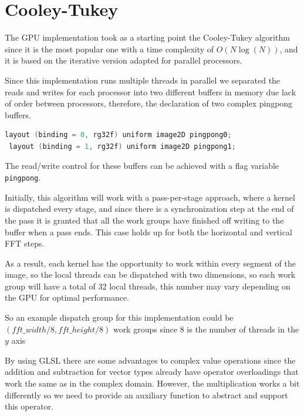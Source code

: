 \documentclass[
  oneside,
  11pt, a4paper,
  footinclude=true,
  headinclude=true,
  cleardoublepage=empty
]{scrbook}
\begin{document}
\section{Cooley-Tukey} \label{sec:ct-impl}


The GPU implementation took as a starting point the Cooley-Tukey algorithm since it is the most popular one with a time complexity of $O(N\log{(N)})$, and it is based on the iterative version adapted for parallel processors.

Since this implementation runs multiple threads in parallel we separated the reads and writes for each processor into two different buffers in memory due lack of order between processors, therefore, the declaration of two complex pingpong buffers.

\begin{lstlisting}[language=C, caption={Input buffer bindings}]
 layout (binding = 0, rg32f) uniform image2D pingpong0;
 layout (binding = 1, rg32f) uniform image2D pingpong1;
\end{lstlisting}

The read/write control for these buffers can be achieved with a flag variable \texttt{pingpong}.

Initially, this algorithm will work with a pass-per-stage approach, where a kernel is dispatched every stage, and since there is a synchronization step at the end of the pass it is granted that all the work groups have finished off writing to the buffer when a pass ends. This case holds up for both the horizontal and vertical FFT steps.

As a result, each kernel has the opportunity to work within every segment of the image, so the local threads can be dispatched with two dimensions, so each work group will have a total of 32 local threads, this number may vary depending on the GPU for optimal performance.

So an example dispatch group for this implementation could be $(fft\_width/8,fft\_height/8)$ work groups since 8 is the number of threads in the $y$ axis

By using GLSL there are some advantages to complex value operations since the addition and subtraction for vector types already have operator overloadings that work the same as in the complex domain. However, the multiplication works a bit differently so we need to provide an auxiliary function to abstract and support this operator.
\end{document}
